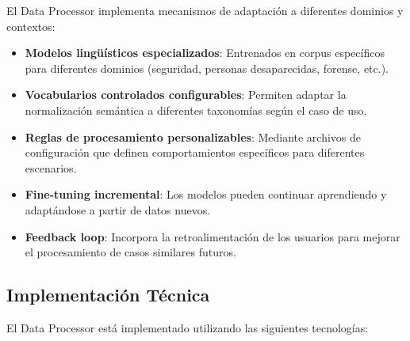 \documentclass[12pt,a4paper]{article}
\begin{document}
El Data Processor implementa mecanismos de adaptación a diferentes dominios y contextos:

\begin{itemize}
    \item \textbf{Modelos lingüísticos especializados}: Entrenados en corpus específicos para diferentes dominios (seguridad, personas desaparecidas, forense, etc.).
    
    \item \textbf{Vocabularios controlados configurables}: Permiten adaptar la normalización semántica a diferentes taxonomías según el caso de uso.
    
    \item \textbf{Reglas de procesamiento personalizables}: Mediante archivos de configuración que definen comportamientos específicos para diferentes escenarios.
    
    \item \textbf{Fine-tuning incremental}: Los modelos pueden continuar aprendiendo y adaptándose a partir de datos nuevos.
    
    \item \textbf{Feedback loop}: Incorpora la retroalimentación de los usuarios para mejorar el procesamiento de casos similares futuros.
\end{itemize}

\subsection{Implementación Técnica}
\label{subsec:dp-implementacion}

El Data Processor está implementado utilizando las siguientes tecnologías:
\end{document}
